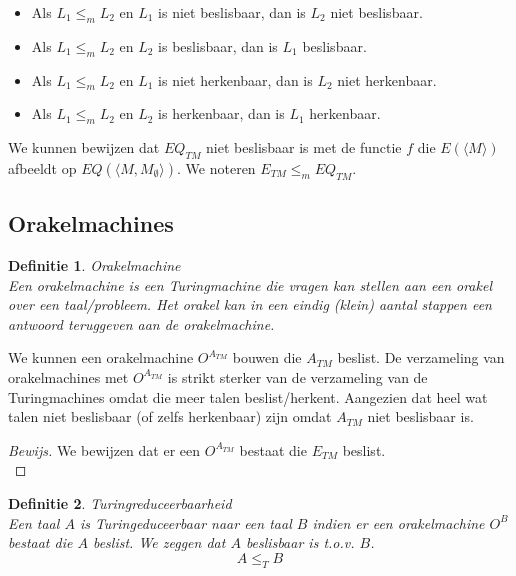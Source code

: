 \documentclass[a4paper]{article}
\newtheorem{tdefinitie}{Definitie}[section]
\newenvironment{definitie}[1]%
  {\begin{mdframed}[backgroundcolor=silver,
    topline=false,
    rightline=false,
    leftline=false,
    bottomline=false]\begin{tdefinitie}#1\\\normalfont}%
  {\end{tdefinitie}\end{mdframed}}
\newenvironment{bewijs}[1]%
  {\begin{mdframed}[topline=true,
    rightline=true,
    leftline=true,
    bottomline=true]\begin{proof}[Bewijs]#1\\[.2cm]\normalfont}%
  {\end{proof}\end{mdframed}}
\newcommand{\atm}{\ensuremath{{A_{TM}}}}
\newcommand{\etm}{\ensuremath{{E_{TM}}}}
\newcommand{\eqtm}{\ensuremath{{EQ_{TM}}}}
\newcommand{\oatm}{\ensuremath{{O^\atm}}}
\begin{document}
\begin{itemize}
\item Als $L_1 \leq_m L_2$ en $L_1$ is niet beslisbaar, dan is $L_2$ niet beslisbaar.
\item Als $L_1 \leq_m L_2$ en $L_2$ is beslisbaar, dan is $L_1$ beslisbaar.
\item Als $L_1 \leq_m L_2$ en $L_1$ is niet herkenbaar, dan is $L_2$ niet herkenbaar.
\item Als $L_1 \leq_m L_2$ en $L_2$ is herkenbaar, dan is $L_1$ herkenbaar.
\end{itemize}

We kunnen bewijzen dat $\eqtm$ niet beslisbaar is met de functie $f$ die $E(\langle M \rangle)$ afbeeldt op $EQ(\langle M,M_\emptyset \rangle)$. We noteren $\etm \leq_m \eqtm$.


\subsection{Orakelmachines}

\begin{definitie}{Orakelmachine}
  Een orakelmachine is een Turingmachine die vragen kan stellen aan een orakel over een taal/probleem. Het orakel kan in een eindig (klein) aantal stappen een antwoord teruggeven aan de orakelmachine.
\end{definitie}

We kunnen een orakelmachine $\oatm$ bouwen die $\atm$ beslist. De verzameling van orakelmachines met $\oatm$ is strikt sterker van de verzameling van de Turingmachines omdat die meer talen beslist/herkent. Aangezien dat heel wat talen niet beslisbaar (of zelfs herkenbaar) zijn omdat $\atm$ niet beslisbaar is.

\begin{bewijs}{We bewijzen dat er een $\oatm$ bestaat die $\etm$ beslist.}
  
\end{bewijs}

\begin{definitie}{Turingreduceerbaarheid}
  Een taal $A$ is Turingeduceerbaar naar een taal $B$ indien er een orakelmachine $O^B$ bestaat die $A$ beslist. We zeggen dat $A$ beslisbaar is t.o.v. $B$.
  \begin{equation*}
  A \leq_T B
  \end{equation*}
\end{definitie}
\end{document}
